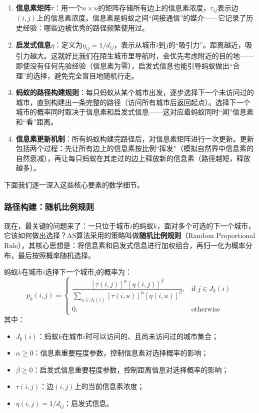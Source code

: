 \documentclass[lang=cn,zihao=-4,a4paper,fontset=windows]{beautybook}
\begin{document}
\begin{enumerate}
    \item \textbf{信息素矩阵$\tau$}：用一个$n\times n$的矩阵存储所有边上的信息素浓度，$\tau_{ij}$表示边$(i,j)$上的信息素浓度。信息素是蚂蚁之间“间接通信”的媒介——它记录了历史经验：哪些边被优秀的路径频繁使用过。
    \item \textbf{启发式信息$\eta$}：定义为$\eta_{ij} = 1/d_{ij}$，表示从城市$i$到$j$的“吸引力”。距离越近，吸引力越大。这就好比我们在陌生城市里导航时，会优先考虑附近的目的地——即使没有任何先验经验（信息素为零），启发式信息也能引导蚂蚁做出“合理”的选择，避免完全盲目地随机行走。
    \item \textbf{蚂蚁的路径构建规则}：每只蚂蚁从某个城市出发，逐步选择下一个未访问过的城市，直到构建出一条完整的路径（访问所有城市后返回起点）。选择下一个城市的概率同时取决于信息素和启发式信息——这对应着蚂蚁同时“闻”信息素和“看”距离。
    \item \textbf{信息素更新机制}：所有蚂蚁构建完路径后，对信息素矩阵进行一次更新。更新包括两个过程：先让所有边上的信息素按比例“挥发”（模拟自然界中信息素的自然衰减），再让每只蚂蚁在其走过的边上释放新的信息素（路径越短，释放越多）。
\end{enumerate}

下面我们逐一深入这些核心要素的数学细节。

\subsubsection{路径构建：随机比例规则}

现在，最关键的问题来了：一只位于城市$i$的蚂蚁$k$，面对多个可选的下一个城市，它该如何做出选择？AS算法采用的策略叫做\textbf{随机比例规则}（Random Proportional Rule），其核心思想是：将信息素和启发式信息进行加权组合，再归一化为概率分布，最后按照概率随机选择。

\begin{definition}[][随机比例规则]
蚂蚁$k$在城市$i$选择下一个城市$j$的概率为：
\[
p_k(i,j) = \begin{cases}
\dfrac{[\tau(i,j)]^\alpha [\eta(i,j)]^\beta}{\displaystyle\sum\limits_{u \in J_k(i)} [\tau(i,u)]^\alpha [\eta(i,u)]^\beta}, & \text{if } j \in J_k(i) \\[12pt]
0, & \text{otherwise}
\end{cases}
\]
其中：
\begin{itemize}
    \item $J_k(i)$：蚂蚁$k$在城市$i$时可以访问的、且尚未访问过的城市集合；
    \item $\alpha \geq 0$：信息素重要程度参数，控制信息素对选择概率的影响；
    \item $\beta \geq 0$：启发式信息重要程度参数，控制距离信息对选择概率的影响；
    \item $\tau(i,j)$：边$(i,j)$上的当前信息素浓度；
    \item $\eta(i,j) = 1/d_{ij}$：启发式信息。
\end{itemize}
\end{definition}
\end{document}
